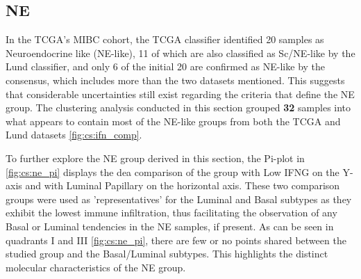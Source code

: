 \subsection{NE} \label{s:cs:ne_interp}


In the TCGA's MIBC cohort, the TCGA classifier identified 20 samples as Neuroendocrine like (NE-like), 11 of which are also classified as Sc/NE-like by the Lund classifier, and only 6 of the initial 20 are confirmed as NE-like by the consensus, which includes more than the two datasets mentioned. This suggests that considerable uncertainties still exist regarding the criteria that define the NE group. The clustering analysis conducted in this section grouped \textbf{32} samples into what appears to contain most of the NE-like groups from both the TCGA and Lund datasets \cref{fig:cs:ifn_comp}.

To further explore the NE group derived in this section, the Pi-plot in \cref{fig:cs:ne_pi} displays the \acrshort{dea} comparison of the group with Low IFNG on the Y-axis and with Luminal Papillary on the horizontal axis. These two comparison groups were used as 'representatives' for the Luminal and Basal subtypes as they exhibit the lowest immune infiltration, thus facilitating the observation of any Basal or Luminal tendencies in the NE samples, if present. As can be seen in quadrants I and III \cref{fig:cs:ne_pi}, there are few or no points shared between the studied group and the Basal/Luminal subtypes. This highlights the distinct molecular characteristics of the NE group.

